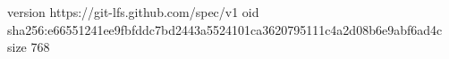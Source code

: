 version https://git-lfs.github.com/spec/v1
oid sha256:e66551241ee9fbfddc7bd2443a5524101ca3620795111c4a2d08b6e9abf6ad4c
size 768
